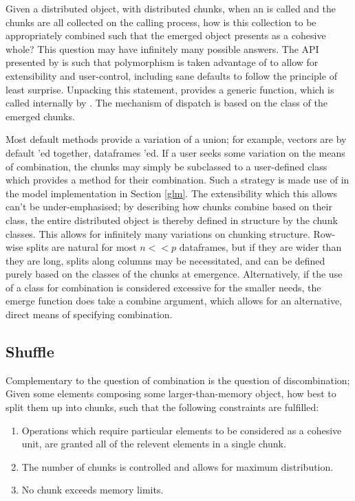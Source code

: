 Given a distributed object, with distributed chunks, when an  is called and the chunks are all collected on the calling process, how is this collection to be appropriately combined such that the emerged object presents as a cohesive whole?
This question may have infinitely many possible answers.
The API presented by \lsr is such that polymorphism is taken advantage of to allow for extensibility and user-control, including sane defaults to follow the principle of least surprise.
Unpacking this statement, \lsr provides a generic  function, which is called internally by .
The mechanism of dispatch is based on the class of the emerged chunks.

Most default  methods provide a variation of a union; for example, vectors are by default 'ed together, dataframes 'ed.
If a user seeks some variation on the means of combination, the chunks may simply be subclassed to a user-defined class which provides a  method for their combination.
Such a strategy is made use of in the model implementation in Section \ref{glm}.
The extensibility which this allows can't be under-emphasised; by describing how chunks combine based on their class, the entire distributed object is thereby defined in structure by the chunk classes.
This allows for infinitely many variations on chunking structure.
Row-wise splits are natural for most $n<<p$ dataframes, but if they are wider than they are long, splits along columns may be necessitated, and can be defined purely based on the classes of the chunks at emergence.
Alternatively, if the use of a class for combination is considered excessive for the smaller needs, the emerge function does take a combine argument, which allows for an alternative, direct means of specifying combination.

\subsection{Shuffle}\label{sec:shuffle}

Complementary to the question of combination is the question of discombination;
Given some elements composing some larger-than-memory object, how best to split them up into chunks, such that the following constraints are fulfilled:

\begin{enumerate}
\item Operations which require particular elements to be considered as a cohesive unit, are granted all of the relevent elements in a single chunk.
\item The number of chunks is controlled and allows for maximum distribution.
\item No chunk exceeds memory limits.
\end{enumerate}

